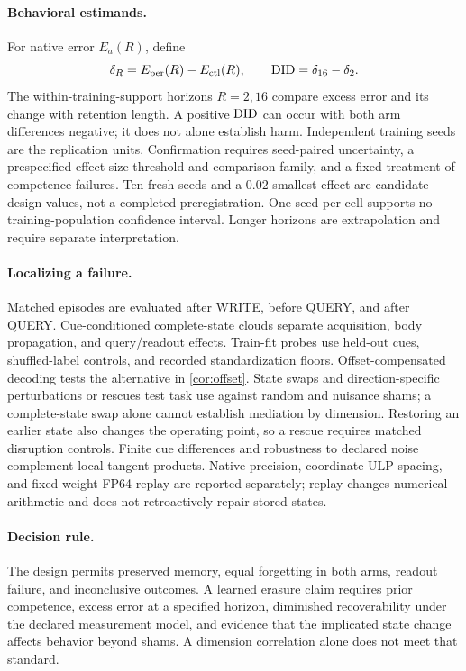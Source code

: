 \paragraph{Behavioral estimands.}
For native error $E_a(R)$, define
\begin{equation}
 \delta_R=E_{\mathrm{per}}(R)-E_{\mathrm{ctl}}(R),\qquad
 \mathrm{DID}=\delta_{16}-\delta_2 .
 \label{eq:contrasts}
\end{equation}
The within-training-support horizons $R=2,16$ compare excess error and its change with retention length. A positive $\mathrm{DID}$ can occur with both arm differences negative; it does not alone establish harm. Independent training seeds are the replication units. Confirmation requires seed-paired uncertainty, a prespecified effect-size threshold and comparison family, and a fixed treatment of competence failures. Ten fresh seeds and a $0.02$ smallest effect are candidate design values, not a completed preregistration. One seed per cell supports no training-population confidence interval. Longer horizons are extrapolation and require separate interpretation.

\paragraph{Localizing a failure.}
Matched episodes are evaluated after WRITE, before QUERY, and after QUERY. Cue-conditioned complete-state clouds separate acquisition, body propagation, and query/readout effects. Train-fit probes use held-out cues, shuffled-label controls, and recorded standardization floors. Offset-compensated decoding tests the alternative in \cref{cor:offset}. State swaps and direction-specific perturbations or rescues test task use against random and nuisance shams; a complete-state swap alone cannot establish mediation by dimension. Restoring an earlier state also changes the operating point, so a rescue requires matched disruption controls. Finite cue differences and robustness to declared noise complement local tangent products. Native precision, coordinate ULP spacing, and fixed-weight FP64 replay are reported separately; replay changes numerical arithmetic and does not retroactively repair stored states.

\paragraph{Decision rule.}
The design permits preserved memory, equal forgetting in both arms, readout failure, and inconclusive outcomes. A learned erasure claim requires prior competence, excess error at a specified horizon, diminished recoverability under the declared measurement model, and evidence that the implicated state change affects behavior beyond shams. A dimension correlation alone does not meet that standard.
